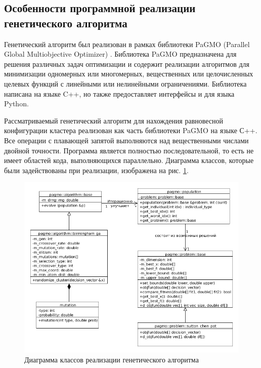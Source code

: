 \subsection{Особенности программной реализации генетического алгоритма}
\label{sec:2e}

Генетический алгоритм был реализован в рамках библиотеки PaGMO
(Parallel Global Multiobjective Optimizer) \cite{pagmo}.
Библиотека PaGMO предназначена для решения различных задач оптимизации
и содержит реализации алгоритмов для минимизации одномерных или многомерных,
вещественных или целочисленных целевых функций с линейными или нелинейными
ограничениями. Библиотека написана на языке C++, но также предоставляет
интерфейсы и для языка Python.

Рассматриваемый генетический алгоритм для нахождения равновесной конфигурации
кластера реализован как часть библиотеки PaGMO на языке С++. Все операции с плавающей
запятой выполняются над вещественными числами двойной точности. Программа является
полностью последовательной, то есть не имеет областей кода, выполняющихся параллельно.
Диаграмма классов, которые были задействованы при реализации, изображена на рис. \ref{class_diagram}.

\begin{figure}[ht!]
\centering
  \includegraphics[width=1.0\textwidth]{./FIGs/pagmo_class_hierarchy.png}
  \caption{Диаграмма классов реализации генетического алгоритма}
\label{class_diagram}
\end{figure}

